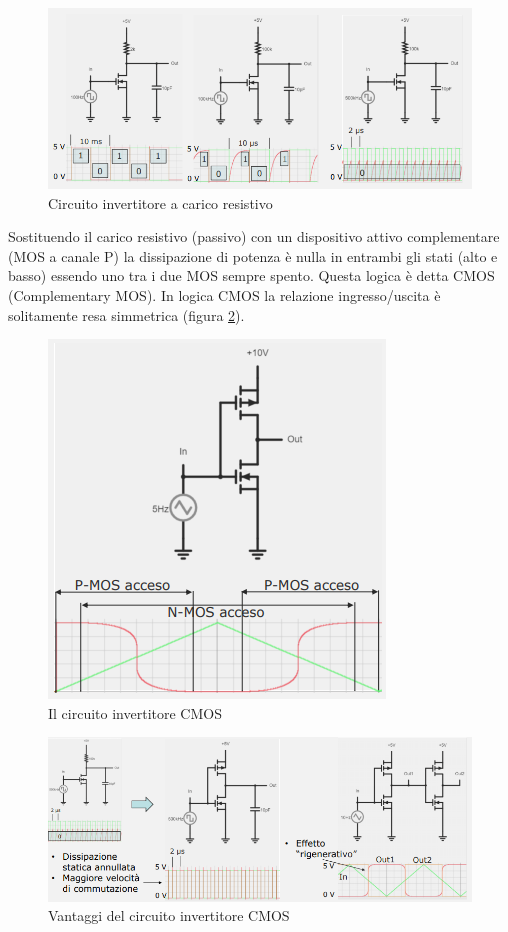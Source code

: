 \documentclass{article}
\begin{document}
\begin{figure}[h]
  \centering
  \includegraphics[scale=0.7]{IM_inverter_esa}
  \caption{Circuito invertitore a carico resistivo}
  \label{Schema_inverter_esa}
\end{figure}

Sostituendo il carico resistivo (passivo) con un dispositivo attivo complementare (MOS a canale P) la dissipazione di potenza è nulla in entrambi gli stati (alto e basso) essendo uno tra i due MOS sempre spento. Questa logica è detta CMOS (Complementary MOS). In logica CMOS la relazione ingresso/uscita è solitamente resa simmetrica (figura \ref{Schema_CMOS}).

\begin{figure}[h]
  \centering
  \includegraphics[scale=0.7]{IM_CMOS}
  \caption{Il circuito invertitore CMOS}
  \label{Schema_CMOS}
\end{figure}

\begin{figure}[h]
  \centering
  \includegraphics[scale=0.7]{IM_CMOS_bis}
  \caption{Vantaggi del circuito invertitore CMOS}
  \label{Schema_CMOS_bis}
\end{figure}
\end{document}
